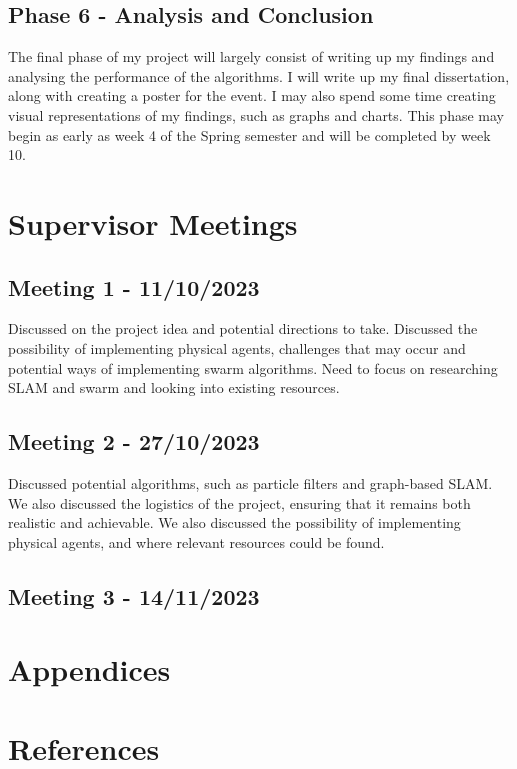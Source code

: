 \documentclass[12pt]{article}
\begin{document}
\subsection{Phase 6 - Analysis and Conclusion}
The final phase of my project will largely consist of writing up my findings and analysing the performance of the algorithms. I will
write up my final dissertation, along with creating a poster for the event. I may also spend some time creating visual representations
of my findings, such as graphs and charts. This phase may begin as early as week 4 of the Spring semester and will be completed by
week 10.
\section{Supervisor Meetings}
\subsection{Meeting 1 - 11/10/2023}
Discussed on the project idea and potential directions to take. Discussed the possibility of implementing physical agents,
challenges that may occur and potential ways of implementing swarm algorithms. Need to focus on researching SLAM and swarm
and looking into existing resources.
\subsection{Meeting 2 - 27/10/2023}
Discussed potential algorithms, such as particle filters and graph-based SLAM. We also discussed the logistics of the project,
ensuring that it remains both realistic and achievable. We also discussed the possibility of implementing physical agents,
and where relevant resources could be found.
\subsection{Meeting 3 - 14/11/2023}

\section{Appendices}

\section{References}
\end{document}
